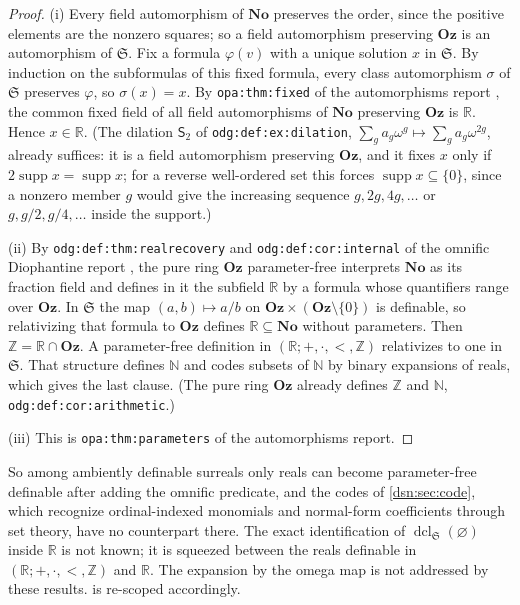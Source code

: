 \documentclass[11pt,a4paper]{article}
\numberwithin{equation}{section}
\theoremstyle{definition}
\theoremstyle{remark}
\newcommand{\No}{\mathbf{No}}
\newcommand{\Oz}{\mathbf{Oz}}
\newcommand{\N}{\mathbb N}
\newcommand{\Z}{\mathbb Z}
\newcommand{\R}{\mathbb R}
\newcommand{\supp}{\operatorname{supp}}
\newcommand{\dcl}{\operatorname{dcl}}
\newcommand{\lbl}[1]{\nolinkurl{#1}}
\begin{document}
\begin{proof}
(i) Every field automorphism of $\No$ preserves the order, since the
positive elements are the nonzero squares; so a field automorphism
preserving $\Oz$ is an automorphism of $\mathfrak S$. Fix a formula
$\varphi(v)$ with a unique solution $x$ in $\mathfrak S$. By induction on
the subformulas of this fixed formula, every class automorphism $\sigma$ of
$\mathfrak S$ preserves $\varphi$, so $\sigma(x)=x$. By
\lbl{opa:thm:fixed} of the automorphisms report \cite{RepoOpa}, the common
fixed field of all field automorphisms of $\No$ preserving $\Oz$ is $\R$.
Hence $x\in\R$. (The dilation $\mathsf S_2$ of \lbl{odg:def:ex:dilation},
$\sum_g a_g\omega^g\mapsto\sum_g a_g\omega^{2g}$, already suffices: it is a
field automorphism preserving $\Oz$, and it fixes $x$ only if
$2\supp x=\supp x$; for a reverse well-ordered set this forces
$\supp x\subseteq\{0\}$, since a nonzero member $g$ would give the
increasing sequence $g,2g,4g,\ldots$ or $g,g/2,g/4,\ldots$ inside the
support.)

(ii) By \lbl{odg:def:thm:realrecovery} and \lbl{odg:def:cor:internal} of the
omnific Diophantine report \cite{RepoOdg}, the pure ring $\Oz$
parameter-free interprets $\No$ as its fraction field and defines in it the
subfield $\R$ by a formula whose quantifiers range over $\Oz$. In
$\mathfrak S$ the map $(a,b)\mapsto a/b$ on $\Oz\times(\Oz\setminus\{0\})$
is definable, so relativizing that formula to $\Oz$ defines $\R\subseteq\No$
without parameters. Then $\Z=\R\cap\Oz$. A parameter-free definition in
$(\R;+,\cdot,<,\Z)$ relativizes to one in $\mathfrak S$. That structure
defines $\N$ and codes subsets of $\N$ by binary expansions of reals, which
gives the last clause. (The pure ring $\Oz$ already defines $\Z$ and $\N$,
\lbl{odg:def:cor:arithmetic}.)

(iii) This is \lbl{opa:thm:parameters} of the automorphisms report.
\end{proof}

So among ambiently definable surreals only reals can become parameter-free
definable after adding the omnific predicate, and the codes of
\cref{dsn:sec:code}, which recognize ordinal-indexed monomials and
normal-form coefficients through set theory, have no counterpart there.
The exact identification of $\dcl_{\mathfrak S}(\varnothing)$ inside $\R$ is
not known; it is squeezed between the reals definable in
$(\R;+,\cdot,<,\Z)$ and $\R$. The expansion by the omega map is not
addressed by these results.  is re-scoped
accordingly.
\end{document}
